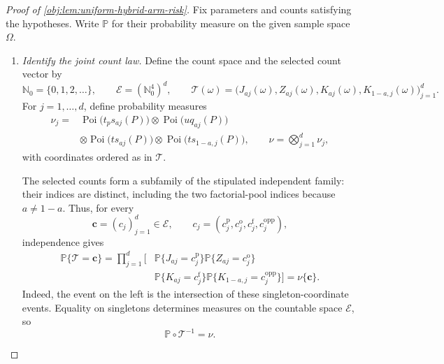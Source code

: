 \begin{proof}[Proof of \cref{obj:lem:uniform-hybrid-arm-risk}]
Fix parameters and counts satisfying the hypotheses. Write \(\mathbb P\) for their probability measure on the given sample space \(\Omega\).

\begin{enumerate}
\item \textit{Identify the joint count law.}
Define the count space and the selected count vector by
\[
\mathbb N_0=\{0,1,2,\ldots\},\qquad
\mathcal E=(\mathbb N_0^4)^d,\qquad
\mathscr T(\omega)
=
\bigl(J_{aj}(\omega),Z_{aj}(\omega),
K_{aj}(\omega),K_{1-a,j}(\omega)\bigr)_{j=1}^d.
\]
For \(j=1,\ldots,d\), define probability measures
\[
\begin{aligned}
\nu_j={}&
\operatorname{Poi}\!\bigl(t_ps_{aj}(P)\bigr)
\otimes\operatorname{Poi}\!\bigl(uq_{aj}(P)\bigr)\\
&\otimes\operatorname{Poi}\!\bigl(ts_{aj}(P)\bigr)
\otimes\operatorname{Poi}\!\bigl(ts_{1-a,j}(P)\bigr),
\qquad
\nu=\bigotimes_{j=1}^d\nu_j,
\end{aligned}
\]
with coordinates ordered as in \(\mathscr T\).

The selected counts form a subfamily of the stipulated independent family: their indices are distinct, including the two factorial-pool indices because \(a\ne1-a\). Thus, for every
\[
\boldsymbol c=(c_j)_{j=1}^d\in\mathcal E,
\qquad
c_j=(c_j^{\mathrm p},c_j^{\mathrm o},
c_j^{\mathrm f},c_j^{\mathrm{opp}}),
\]
independence gives
\[
\begin{aligned}
\mathbb P\{\mathscr T=\boldsymbol c\}
=\prod_{j=1}^d\bigl[
&\mathbb P\{J_{aj}=c_j^{\mathrm p}\}
\mathbb P\{Z_{aj}=c_j^{\mathrm o}\}\\
&\mathbb P\{K_{aj}=c_j^{\mathrm f}\}
\mathbb P\{K_{1-a,j}=c_j^{\mathrm{opp}}\}
\bigr]
=\nu\{\boldsymbol c\}.
\end{aligned}
\]
Indeed, the event on the left is the intersection of these singleton-coordinate events. Equality on singletons determines measures on the countable space \(\mathcal E\), so
\[
\mathbb P\circ\mathscr T^{-1}=\nu.
\]


\end{enumerate}
\end{proof}
